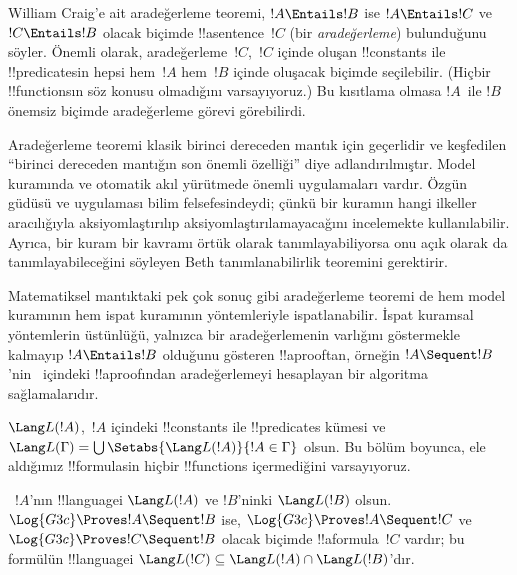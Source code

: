 



William Craig'e ait aradeğerleme teoremi, $!A \Entails !B$ ise $!A
\Entails !C$ ve $!C \Entails !B$ olacak biçimde !!a{sentence}~$!C$ (bir
\emph{aradeğerleme}) bulunduğunu söyler. Önemli olarak,
aradeğerleme~$!C$,~$!C$ içinde oluşan !!{constant}s ile !!{predicate}s{}in
hepsi hem~$!A$ hem~$!B$ içinde oluşacak biçimde seçilebilir. (Hiçbir
!!{function}s{}ın söz konusu olmadığını varsayıyoruz.) Bu kısıtlama olmasa
$!A$~ile $!B$ önemsiz biçimde aradeğerleme görevi görebilirdi.

Aradeğerleme teoremi klasik birinci dereceden mantık için geçerlidir ve
keşfedilen ``birinci dereceden mantığın son önemli özelliği'' diye
adlandırılmıştır. Model kuramında ve otomatik akıl yürütmede önemli
uygulamaları vardır. Özgün güdüsü ve uygulaması bilim felsefesindeydi;
çünkü bir kuramın hangi ilkeller aracılığıyla aksiyomlaştırılıp
aksiyomlaştırılamayacağını incelemekte kullanılabilir. Ayrıca, bir kuram bir
kavramı örtük olarak tanımlayabiliyorsa onu açık olarak da
tanımlayabileceğini söyleyen Beth tanımlanabilirlik teoremini gerektirir.

Matematiksel mantıktaki pek çok sonuç gibi aradeğerleme teoremi de hem model
kuramının hem ispat kuramının yöntemleriyle ispatlanabilir. İspat kuramsal
yöntemlerin üstünlüğü, yalnızca bir aradeğerlemenin varlığını göstermekle
kalmayıp $!A \Entails !B$ olduğunu gösteren !!a{proof}{}tan, örneğin $!A
\Sequent !B$'nin~ içindeki !!a{proof}{}ından aradeğerlemeyi hesaplayan
bir algoritma sağlamalarıdır.

$\Lang L(!A)$,~$!A$ içindeki !!{constant}s ile !!{predicate}s kümesi ve
$\Lang L(\Gamma) = \bigcup \Setabs{\Lang L(!A)}{!A \in \Gamma}$ olsun. Bu
bölüm boyunca, ele aldığımız !!{formula}s{}in hiçbir !!{function}s
içermediğini varsayıyoruz.

\begin{thm}
~$!A$'nın !!{language}{}i $\Lang L(!A)$ ve $!B$'ninki $\Lang L(!B)$ olsun.
$\Log{G3c} \Proves !A \Sequent !B$ ise, $\Log{G3c} \Proves !A \Sequent !C$
ve $\Log{G3c} \Proves !C \Sequent !B$ olacak biçimde !!a{formula}~$!C$
vardır; bu formülün !!{language}{}i $\Lang L(!C) \subseteq \Lang L(!A) \cap
\Lang L(!B)$'dır.
\end{thm}


